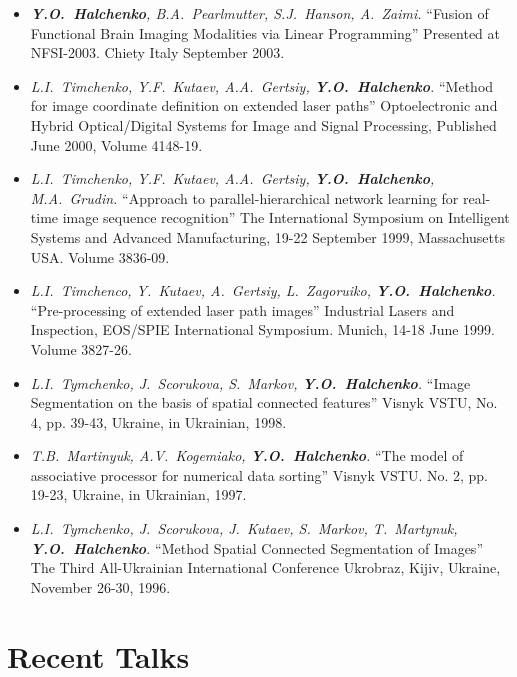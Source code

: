 \documentclass[12pt,overlapped,line]{res}
\newcommand{\mtitle}[1]{``#1''}
\newcommand{\mauthors}[1]{ \textit{#1.}}
\newcommand{\mwhere}[1]{#1.}
\begin{document}
\begin{resume}
\begin{itemize}
  \item
     \mauthors{\textbf{Y.O.~Halchenko}, B.A.~Pearlmutter, S.J.~Hanson, A.~Zaimi}
     \mtitle{Fusion of Functional Brain Imaging Modalities via Linear Programming}
     \mwhere{Presented at NFSI-2003. Chiety Italy September 2003}

  \item
     \mauthors{L.I.~Timchenko, Y.F.~Kutaev, A.A.~Gertsiy, \textbf{Y.O.~Halchenko}}
     \mtitle{Method for image coordinate definition on extended laser paths}
     \mwhere{Optoelectronic and Hybrid Optical/Digital Systems for Image and Signal Processing, Published June 2000,  Volume 4148-19}

  \item
     \mauthors{L.I.~Timchenko, Y.F.~Kutaev, A.A.~Gertsiy, \textbf{Y.O.~Halchenko},
     M.A.~Grudin}
     \mtitle{Approach to parallel-hierarchical network learning for real-time image sequence recognition}
     \mwhere{The International Symposium on Intelligent Systems and Advanced Manufacturing, 19-22 September 1999, Massachusetts USA. Volume 3836-09}

   \item
     \mauthors{L.I.~Timchenco, Y.~Kutaev, A.~Gertsiy, L.~Zagoruiko, \textbf{Y.O.~Halchenko}}
     \mtitle{Pre-processing of extended laser path images}
     \mwhere{Industrial Lasers and Inspection, EOS/SPIE International Symposium. Munich, 14-18 June 1999. Volume 3827-26}

   \item
     \mauthors{L.I.~Tymchenko, J.~Scorukova, S.~Markov, \textbf{Y.O.~Halchenko}}
     \mtitle{Image Segmentation on the basis of spatial connected features}
     \mwhere{Visnyk VSTU, No. 4, pp. 39-43, Ukraine, in Ukrainian, 1998}

   \item
     \mauthors{T.B.~Martinyuk, A.V.~Kogemiako, \textbf{Y.O.~Halchenko}}
     \mtitle{The model of associative processor for numerical data sorting}
     \mwhere{ Visnyk VSTU. No. 2, pp. 19-23, Ukraine, in Ukrainian, 1997}

   \item
     \mauthors{L.I.~Tymchenko, J.~Scorukova, J.~Kutaev, S.~Markov, T.~Martynuk, \textbf{Y.O.~Halchenko}}
     \mtitle{Method Spatial Connected Segmentation of Images}
     \mwhere{The Third All-Ukrainian International Conference Ukrobraz, Kijiv, Ukraine, November 26-30, 1996}
 \end{itemize}

\section{Recent Talks}


\end{resume}
\end{document}
